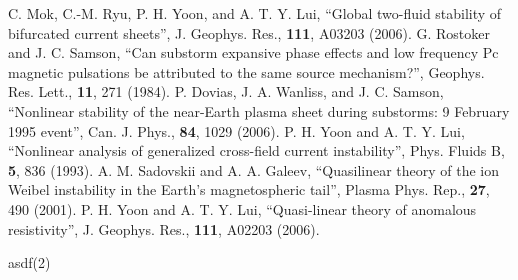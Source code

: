 \documentclass{gshs-report-v1.2}
\begin{document}
\begin{thebibliography}{99}
C. Mok, C.-M. Ryu, P. H. Yoon, and A. T. Y. Lui, ``Global two-fluid stability of bifurcated current sheets'', J. Geophys. Res., {\bf 111}, A03203 (2006).
 G. Rostoker and J. C. Samson, ``Can substorm expansive phase effects and low frequency Pc magnetic pulsations be attributed to the same source mechanism?'', Geophys. Res. Lett., {\bf 11}, 271 (1984).
 P. Dovias, J. A. Wanliss, and J. C. Samson, ``Nonlinear stability of the near-Earth plasma sheet during substorms: 9 February 1995 event'', Can. J. Phys., {\bf 84}, 1029 (2006).
 P. H. Yoon and A. T. Y. Lui, ``Nonlinear analysis of generalized cross-field current instability'', Phys. Fluids B, {\bf 5}, 836 (1993).
 A. M. Sadovskii and A. A. Galeev, ``Quasilinear theory of the ion Weibel instability in the Earth's magnetospheric tail'', Plasma Phys. Rep., {\bf 27}, 490 (2001).
 P. H. Yoon and A. T. Y. Lui, ``Quasi-linear theory of anomalous resistivity'', J. Geophys. Res., {\bf 111}, A02203 (2006).

 asdf(2)
\end{thebibliography}

%
%
%
%
%
\end{document}
